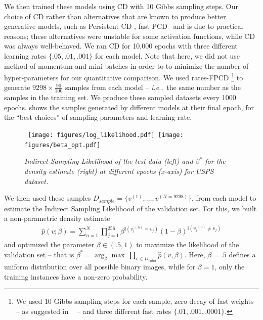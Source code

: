 \documentclass[twoside]{article}
\theoremstyle{plain}
\theoremstyle{definition}
\theoremstyle{remark}
\newcommand{\ie}[0]{\emph{i.e.},~}
\newcommand{\boldit}[1]{\ensuremath{#1}}
\newcommand{\sfit}[1]{\ensuremath{#1}}
\newcommand{\xx}[0]{\ensuremath{\boldit{v}}}%
\newcommand{\x}[0]{\ensuremath{{v}}}%
\newcommand{\pp}[0]{\ensuremath{\sfit{p}}}%
\newcommand{\DD}[0]{\ensuremath{\boldit{\sfit{D}}}}%
\newcommand{\nn}[1]{\ensuremath{^{(#1)}}}%
\newcommand{\identt}[0]{\ensuremath{\mathbb{I}}}%
\begin{document}
We then trained these models using CD with 10 Gibbs sampling steps. 
Our choice of CD rather than 
alternatives that are known to produce better generative models, such as Persistent CD \citep[PCD;][]{tieleman2008training}, fast PCD~\citep[FPCD;][]{tieleman2009using} and  
\citep[rates-FPCD;][]{breuleux2011quickly} is due to practical reasons; these alternatives were unstable for some activation functions, while CD was always well-behaved. 
We ran CD for 10,000 epochs with three different learning rates $\{.05, .01,.001\}$ for each model. Note that here, we did not use method of momentum and mini-batches in order to to minimize the number of hyper-parameters for our quantitative comparison. We used rates-FPCD \footnote{ We used $10$ Gibbs sampling steps for each sample, zero decay of fast weights -- as suggested in ~\citep{breuleux2011quickly} -- and three different fast rates $\{.01, .001,.0001\}$.} to generate  $9298 \times \frac{90}{100}$  samples from each model -- \ie the same number as the samples in the training set. We produce these sampled datasets every 1000 epochs.
 shows the samples generated by different models at their final epoch, for the ``best choices'' of sampling parameters and learning rate.

\begin{figure}
  \centering
\hbox{
\texttt{[image: figures/log\_likelihood.pdf]} 
\texttt{[image: figures/beta\_opt.pdf]} 
}
  \caption{\it \small  Indirect Sampling Likelihood of the test data (left) and $\beta^*$ for the density estimate (right) at different epochs (x-axis) for USPS dataset. }\label{fig:ISL}
\end{figure}

We then used these samples $\DD_{sample} = \{\xx\nn{1},\ldots,\xx\nn{N=9298}\}$, from each model to estimate the Indirect Sampling Likelihood \citep[ISL;][]{breuleux2011quickly} of the validation set. For this, we built a non-parametric density estimate 
\begin{align}
  \label{eq:kde}
  \hat{\pp}(\xx; \beta) = \sum_{n=1}^{N} \prod_{j=1}^{256} \beta^{\identt(\x_j\nn{n} = \x_j)} (1 - \beta)^{\identt(\x_j\nn{n} \neq \x_j)}
\end{align}
and optimized the parameter $\beta \in (.5,1)$ to maximize the likelihood of the validation set -- that is $\beta^* = \arg_{\beta}\max\, \prod_{\xx \in \DD_{valid}} \hat{\pp}(\xx, \beta)$. Here,  $\beta = .5$ defines a uniform distribution over all possible binary images, while for $\beta = 1$, only the training instances have a non-zero probability.
\end{document}
